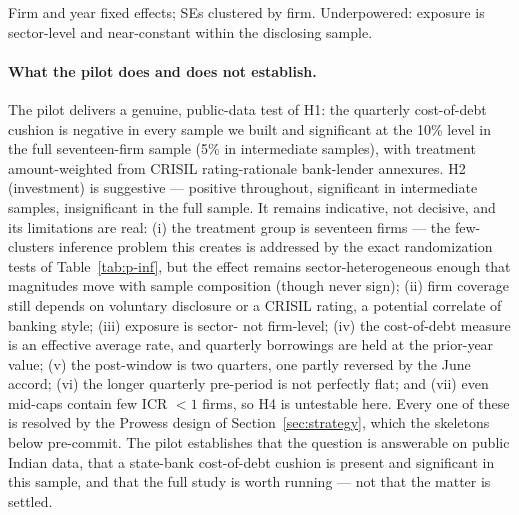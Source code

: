 \documentclass[12pt]{article}
\begin{document}
\begin{table}[t]
\centering
\begin{threeparttable}
\caption{Pilot: triple difference (sector-level exposure)}
\label{tab:p-ddd}
\small

\begin{tablenotes}\footnotesize
\item Firm and year fixed effects; SEs clustered by firm. Underpowered: exposure is
sector-level and near-constant within the disclosing sample.
\end{tablenotes}
\end{threeparttable}
\end{table}

\paragraph{What the pilot does and does not establish.}\label{sec:pilot-caveats}
The pilot delivers a genuine, public-data test of H1: the quarterly cost-of-debt cushion is
negative in every sample we built and significant at the 10\% level in the full seventeen-firm
sample (5\% in intermediate samples), with treatment amount-weighted from CRISIL
rating-rationale bank-lender annexures. H2 (investment) is suggestive --- positive throughout,
significant in intermediate samples, insignificant in the full sample. It remains indicative,
not decisive, and its limitations are real: (i) the treatment group is seventeen firms ---
the few-clusters inference problem this creates is addressed by the exact randomization
tests of Table~\ref{tab:p-inf}, but the effect remains sector-heterogeneous enough that
magnitudes move with sample composition (though never sign); (ii) firm coverage still depends on voluntary
disclosure or a CRISIL rating, a potential correlate of banking style; (iii) exposure is
sector- not firm-level; (iv) the cost-of-debt measure is an effective average rate, and
quarterly borrowings are held at the prior-year value; (v) the post-window is two quarters,
one partly reversed by the June accord; (vi) the longer quarterly pre-period is not perfectly
flat; and (vii) even mid-caps contain few ICR $<1$ firms, so H4 is untestable here. Every one
of these is resolved by the Prowess design of Section~\ref{sec:strategy}, which the skeletons
below pre-commit. The pilot establishes that the question is answerable on public Indian data,
that a state-bank cost-of-debt cushion is present and significant in this sample, and that the
full study is worth running --- not that the matter is settled.
\end{document}
